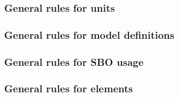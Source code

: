 \begin{sbmlenum}
\end{sbmlenum} \subsubsection*{General rules for units} \begin{sbmlenum}


\end{sbmlenum} \subsubsection*{General rules for model definitions} \begin{sbmlenum}


\end{sbmlenum} \subsubsection*{General rules for SBO usage} \begin{sbmlenum}



\end{sbmlenum} \subsubsection*{General rules for  elements} \begin{sbmlenum}



\end{sbmlenum}
